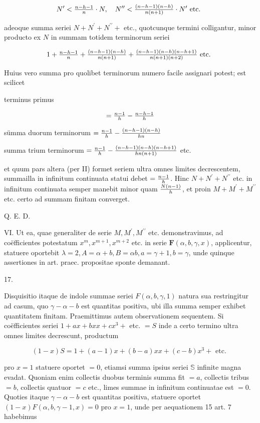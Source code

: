 \documentclass[twoside,12pt, showframe]{memoir}
\let\oldfrac\frac
\def\frac#1#2{\mathchoice{\tfrac{#1}{#2}}{\oldfrac{#1}{#2}}{\genfrac{}{}{}{2}{#1}{#2\mathstrut}}{\genfrac{}{}{}{3}{#1}{#2\mathstrut}}}
\begin{document}
\[
N^{\prime}<\frac{n-h-1}{n} \cdot N, \quad N^{\prime \prime}<\frac{(n-h-1)(n-h)}{n(n+1)} \cdot N^{\prime} \text { etc. }
\]

adeoque summa seriei \(N+N^{\prime}+N^{\prime \prime}+\) etc., quotcunque termini colligantur, minor producto ex \(N\) in summam totidem terminorum seriei

\[
1+\frac{n-h-1}{n}+\frac{(n-h-1)(n-h)}{n(n+1)}+\frac{(n-h-1)(n-h)(n-h+1)}{n(n+1)(n+2)} \text { etc. }
\]

Huius vero summa pro quolibet terminorum numero facile assignari potest; est scilicet

terminus primus

\[
=\frac{n-1}{h}-\frac{n-h-1}{h}
\]

sümma duorum terminorum \(=\frac{n-1}{h}-\frac{(n-h-1)(n-h)}{h n}\)

summa trium terminorum \(=\frac{n-1}{h}-\frac{(n-h-1)(n-h)(n-h+1)}{h n(n+1)}\) etc.

et quum pars altera (per II) formet seriem ultra omnes limites decrescentem, summailla in infinitum continuata statui debet \(=\frac{n-1}{h}\). Hinc \(N+N^{\prime}+N^{\prime \prime}\) etc. in infinitum continuata semper manebit minor quam \(\frac{N(n-1)}{h}\), et proin \(M+M^{\prime}+M^{\prime \prime}\) etc. certo ad summam finitam converget.

Q. E. D.

VI. Ut ea, quae generaliter de serie \(M, M^{\prime}, M^{\prime \prime}\) etc. demonstravimus, ad coëfficientes potestatum \(x^{m}, x^{m+1}, x^{m+2}\) etc. in serie \(\boldsymbol{F}(\alpha, b, \gamma, x)\), applicentur, statuere oportebit \(\lambda=2, A=\alpha+b, B=\alpha b, a=\gamma+1, b=\gamma\), unde quinque assertiones in art. praec. propositae sponte demanant.

17.

Disquisitio itaque de indole summae seriei \(F(\alpha, b, \gamma, 1)\) natura sua restringitur ad casum, quo \(\gamma-\alpha-b\) est quantitas positiva, ubi illa summa semper exhibet quantitatem finitam. Praemittimus autem observationem sequentem. Si coëfficientes seriei \(1+a x+b x x+c x^{3}+\) etc. \(=S\) inde a certo termino ultra omnes limites decrescunt, productum

\[
(1-x) S=1+(a-1) x+(b-a) x x+(c-b) x^{3}+\text { etc. }
\]

pro \(x=1\) statuere oportet \(=0\), etiamsi summa ipsius seriei \(\mathbb{S}\) infinite magna evadat. Quoniam enim collectis duobus terminis summa fit \(=a\), collectis tribus \(=b\), collectis quatuor \(=c\) etc., limes summae in infinitum continuatae est \(=0\). Quoties itaque \(\gamma-\alpha-b\) est quantitas positiva, statuere oportet \((1-x) F(\alpha, b, \gamma-1, x)=0\) pro \(x=1\), unde per aequationem 15 art. 7 habebimus
\end{document}
